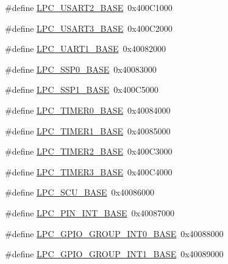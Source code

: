 \begin{DoxyCompactItemize}
\item 
\#define \hyperlink{group___p_e_r_i_p_h__18_x_x___b_a_s_e_gac377e7801bf13eb388b8f2cbdc61091f}{L\+P\+C\+\_\+\+U\+S\+A\+R\+T2\+\_\+\+B\+A\+SE}~0x400\+C1000
\item 
\#define \hyperlink{group___p_e_r_i_p_h__18_x_x___b_a_s_e_gabe7b830995c08b4b9ecd941f14c2a593}{L\+P\+C\+\_\+\+U\+S\+A\+R\+T3\+\_\+\+B\+A\+SE}~0x400\+C2000
\item 
\#define \hyperlink{group___p_e_r_i_p_h__18_x_x___b_a_s_e_ga18e8f96b25e3f343bdd7ba552ae7a617}{L\+P\+C\+\_\+\+U\+A\+R\+T1\+\_\+\+B\+A\+SE}~0x40082000
\item 
\#define \hyperlink{group___p_e_r_i_p_h__18_x_x___b_a_s_e_ga53fb1af80b541545988f2a966681abfd}{L\+P\+C\+\_\+\+S\+S\+P0\+\_\+\+B\+A\+SE}~0x40083000
\item 
\#define \hyperlink{group___p_e_r_i_p_h__18_x_x___b_a_s_e_ga05d118997f53f596d3a087f8b91a1969}{L\+P\+C\+\_\+\+S\+S\+P1\+\_\+\+B\+A\+SE}~0x400\+C5000
\item 
\#define \hyperlink{group___p_e_r_i_p_h__18_x_x___b_a_s_e_ga58d2cc2a6a4bd9319853ad5b62a20d43}{L\+P\+C\+\_\+\+T\+I\+M\+E\+R0\+\_\+\+B\+A\+SE}~0x40084000
\item 
\#define \hyperlink{group___p_e_r_i_p_h__18_x_x___b_a_s_e_ga077e94a95d95d79f6aeb0ea962377c46}{L\+P\+C\+\_\+\+T\+I\+M\+E\+R1\+\_\+\+B\+A\+SE}~0x40085000
\item 
\#define \hyperlink{group___p_e_r_i_p_h__18_x_x___b_a_s_e_gab46122134a159b494e060ae3a7be0967}{L\+P\+C\+\_\+\+T\+I\+M\+E\+R2\+\_\+\+B\+A\+SE}~0x400\+C3000
\item 
\#define \hyperlink{group___p_e_r_i_p_h__18_x_x___b_a_s_e_ga002e95d51eef32473052ea2575440eac}{L\+P\+C\+\_\+\+T\+I\+M\+E\+R3\+\_\+\+B\+A\+SE}~0x400\+C4000
\item 
\#define \hyperlink{group___p_e_r_i_p_h__18_x_x___b_a_s_e_gacd777eafbfcbc5701c9728c9261b1bd1}{L\+P\+C\+\_\+\+S\+C\+U\+\_\+\+B\+A\+SE}~0x40086000
\item 
\#define \hyperlink{group___p_e_r_i_p_h__18_x_x___b_a_s_e_ga4941871b3be823925361fe29e1d7721f}{L\+P\+C\+\_\+\+P\+I\+N\+\_\+\+I\+N\+T\+\_\+\+B\+A\+SE}~0x40087000
\item 
\#define \hyperlink{group___p_e_r_i_p_h__18_x_x___b_a_s_e_ga4bb8560e4125ff2b4dca337887316977}{L\+P\+C\+\_\+\+G\+P\+I\+O\+\_\+\+G\+R\+O\+U\+P\+\_\+\+I\+N\+T0\+\_\+\+B\+A\+SE}~0x40088000
\item 
\#define \hyperlink{group___p_e_r_i_p_h__18_x_x___b_a_s_e_ga198273b5c9e2dd57ffc28571c509f346}{L\+P\+C\+\_\+\+G\+P\+I\+O\+\_\+\+G\+R\+O\+U\+P\+\_\+\+I\+N\+T1\+\_\+\+B\+A\+SE}~0x40089000

\end{DoxyCompactItemize}
